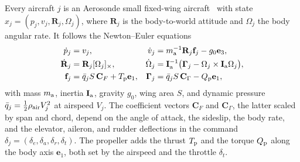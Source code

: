 \ifvehicledetail
Every aircraft $j$ is an Aerosonde small fixed-wing aircraft~\cite{beard2012small} with state $x_j=(p_j,v_j,\mathbf R_j,\Omega_j)$, where $\mathbf R_j$ is the body-to-world attitude and $\Omega_j$ the body angular rate. It follows the Newton--Euler equations
\begin{align}
\dot p_j&=v_j, & \dot v_j&=m_{\rm a}^{-1}\mathbf R_j\mathbf f_j-g_0\mathbf e_3,\nonumber\\
\dot{\mathbf R}_j&=\mathbf R_j[\Omega_j]_\times, & \dot\Omega_j&=\mathbf I_{\rm a}^{-1}\big(\boldsymbol\Gamma_j-\Omega_j\times\mathbf I_{\rm a}\Omega_j\big),\nonumber\\
\mathbf f_j&=\bar q_jS\,\mathbf C_F+T_{\rm p}\mathbf e_1, & \boldsymbol\Gamma_j&=\bar q_jS\,\mathbf C_\Gamma-Q_{\rm p}\mathbf e_1,
\label{eq:fw-dynamics}
\end{align}
with mass $m_{\rm a}$, inertia $\mathbf I_{\rm a}$, gravity $g_0$, wing area $S$, and dynamic pressure $\bar q_j=\tfrac12\rho_{\rm air}V_j^2$ at airspeed $V_j$. The coefficient vectors $\mathbf C_F$ and $\mathbf C_\Gamma$, the latter scaled by span and chord, depend on the angle of attack, the sideslip, the body rate, and the elevator, aileron, and rudder deflections in the command $\delta_j=(\delta_e,\delta_a,\delta_r,\delta_t)$. The propeller adds the thrust $T_{\rm p}$ and the torque $Q_{\rm p}$ along the body axis $\mathbf e_1$, both set by the airspeed and the throttle $\delta_t$.

